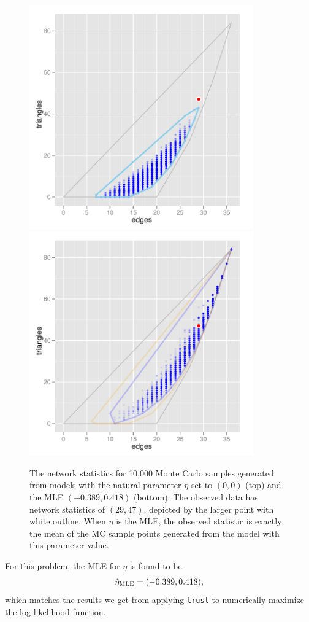 \begin{figure}[!ht]
\centering
\includegraphics[width=3.8in]{Figures/MCsample-far}
\includegraphics[width=3.8in]{Figures/MCsample-MLE}
\caption{The network statistics for 10,000 Monte Carlo samples generated from models 
with the natural parameter $\eta$ set to $(0,0)$ (top) and the MLE $(-0.389, 0.418)$ 
(bottom).  The observed data has network statistics of $(29,47)$, depicted by the 
larger point with white outline.  When $\eta$ is the MLE, the observed statistic is 
exactly the mean of the MC sample points generated from the model with this parameter 
value. }
\label{F:MC cloud}
\end{figure}
For this problem, the MLE for $\eta$ is found to be
\begin{align*}
\hat{\eta}_{\textrm{MLE}} = (-0.389, 0.418),
\end{align*}
which matches the results we get from applying \texttt{trust} to numerically
maximize the log likelihood function.

